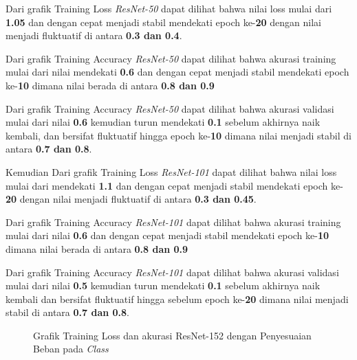 Dari grafik Training Loss \emph{ResNet-50} dapat dilihat bahwa nilai loss mulai dari \textbf{1.05} dan dengan cepat menjadi stabil mendekati epoch ke-\textbf{20} dengan nilai menjadi fluktuatif di antara \textbf{0.3 dan 0.4}.

Dari grafik Training Accuracy \emph{ResNet-50} dapat dilihat bahwa akurasi training mulai dari nilai mendekati \textbf{0.6} dan dengan cepat menjadi stabil mendekati epoch ke-\textbf{10} dimana nilai berada di antara \textbf{0.8 dan 0.9} 

Dari grafik Training Accuracy \emph{ResNet-50} dapat dilihat bahwa akurasi validasi mulai dari nilai \textbf{0.6} kemudian turun mendekati \textbf{0.1} sebelum akhirnya naik kembali, dan bersifat fluktuatif hingga epoch ke-\textbf{10} dimana nilai menjadi stabil di antara \textbf{0.7 dan 0.8}.

Kemudian Dari grafik Training Loss \emph{ResNet-101} dapat dilihat bahwa nilai loss mulai dari mendekati \textbf{1.1} dan dengan cepat menjadi stabil mendekati epoch ke-\textbf{20} dengan nilai menjadi fluktuatif di antara \textbf{0.3 dan 0.45}.

Dari grafik Training Accuracy \emph{ResNet-101} dapat dilihat bahwa akurasi training mulai dari nilai \textbf{0.6} dan dengan cepat menjadi stabil mendekati epoch ke-\textbf{10} dimana nilai berada di antara \textbf{0.8 dan 0.9} 

Dari grafik Training Accuracy \emph{ResNet-101} dapat dilihat bahwa akurasi validasi mulai dari nilai \textbf{0.5} kemudian turun mendekati \textbf{0.1} sebelum akhirnya naik kembali dan bersifat fluktuatif hingga sebelum epoch ke-\textbf{20} dimana nilai menjadi stabil di antara \textbf{0.7 dan 0.8}.

\begin{figure}[H]
	\centering
	\caption{Grafik Training Loss dan akurasi ResNet-152 dengan Penyesuaian Beban pada \emph{Class}}
	\label{fig:graphTrainingWeightedPt3}
\end{figure}

